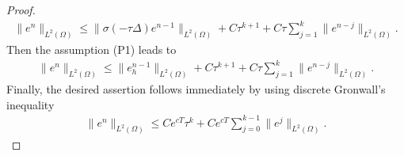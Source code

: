 \documentclass[10pt,final,leqno,onefignum,onetabnum]{siamltex}%
\def\leq{\leqslant}
\def\II{(\Omega)}
\begin{document}
\begin{proof}
\begin{align*}
\|  e ^n \|_{L^2\II} \le \|  \sigma(-\tau \Delta)e ^{n-1} \|_{L^2\II}  +  C \tau^{k+1}  + C \tau \sum_{j=1}^k \|  e^{n-j}  \|_{L^2\II}.
\end{align*}
Then the assumption (P1) leads to
\begin{align*}
\|  e ^n \|_{L^2\II} \le \|  e_h^{n-1} \|_{L^2\II}  +  C \tau^{k+1}  + C \tau \sum_{j=1}^k \|  e^{n-j}  \|_{L^2\II}.
\end{align*}
Finally, the desired assertion follows immediately by using discrete Gronwall's inequality
\begin{align*}
\|  e ^n \|_{L^2\II}  \le  C e^{cT} \tau^{k}  + C e^{cT}  \sum_{j=0}^{k-1} \|  e^{j}  \|_{L^2\II}.
\end{align*}
\end{proof}

\end{document}
